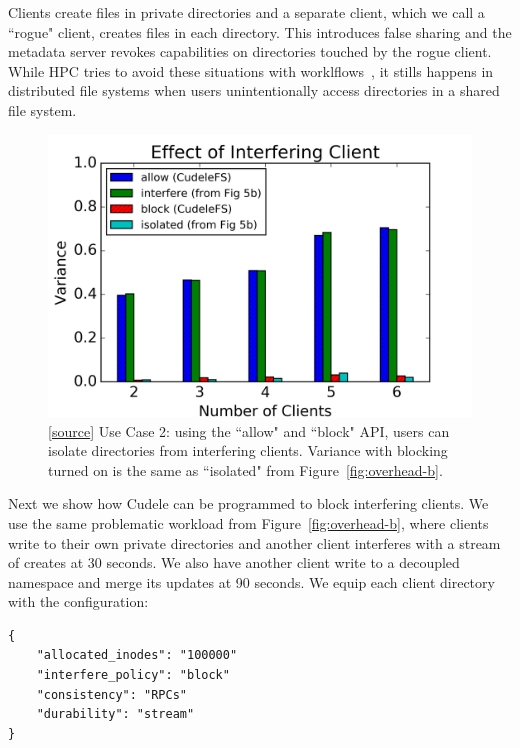 Clients create files in private directories and a separate client, which we
call a ``rogue" client, creates files in each directory. This introduces false
sharing and the metadata server revokes capabilities on directories touched by
the rogue client. While HPC tries to avoid these situations with
worklflows~\cite{zheng:pdsw2014-batchfs, zheng:pdsw2015-deltafs}, it stills
happens in distributed file systems when users unintentionally access
directories in a shared file system.

\begin{figure}[tb]
\centering
\includegraphics[width=1.0\linewidth]{graphs/slowdown-allow-block.png}
\caption{ [\href{https://...}{source}] Use Case 2: using the ``allow" and
``block" API, users can isolate directories from interfering clients. Variance
with blocking turned on is the same as ``isolated" from
Figure~\ref{fig:overhead-b}.
\label{fig:slowdown-allow-block}}

\end{figure}

Next we show how Cudele can be programmed to block interfering clients. We
use the same problematic workload from Figure~\ref{fig:overhead-b}, where
clients write to their own private directories and another client interferes with a stream of creates at
30 seconds.  We also have another client write to a decoupled namespace and
merge its updates at 90 seconds.  We equip each client directory with the
configuration:

\begin{listing}[tb]
\begin{verbatim}
{     
    "allocated_inodes": "100000"
    "interfere_policy": "block"
    "consistency": "RPCs"
    "durability": "stream"
}
\end{verbatim}
\end{listing}

